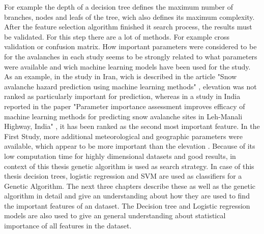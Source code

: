 \documentclass[../masterarbeit.tex]{subfiles}
\begin{document}
For example the depth of a decision tree defines the maximum number of branches, nodes and leafs of the tree, wich also defines its maximum complexity.
After the feature selection algorithm finished it search process, the results must be validated. For this step there are a lot of methods. For example cross validation or confusion matrix. \autocite[]{VenkateshAnuradha:2019}
How important parameters were considered to be for the avalanches in each study seems to be strongly related to what parameters were available and wich machine learning models have been used for the study. 
As an example, in the study in Iran, wich is described in the article "Snow avalanche hazard prediction using machine learning methods" \textcite[]{Bahram:2019}, elevation was not ranked as particularly important for prediction, whereas in a study in India reported in the paper "Parameter importance assessment improves efficacy of machine learning methods for predicting snow avalanche sites in Leh-Manali Highway, India" \textcite[][]{Tiwari:2021}, it has been ranked as the second most important feature. 
In the First Study, more additional meteorological and geographic parameters were available, which appear to be more important than the elevation \textcite[]{Bahram:2019} \textcite[]{Tiwari:2021}.
Because of its low computation time for highly dimensional datasets and good results, in context of this thesis genetic algorithm is used as search strategy.  
In case of this thesis decision trees, logistic regression and SVM are used as classifiers for a Genetic Algorithm. The next three chapters describe these as well as the genetic algorithm in detail and give an understanding about how they are used to find the important features of an dataset. The Decision tree and Logistic regression models are also used to give an general understanding about statistical importance of all features in the dataset.
\end{document}
